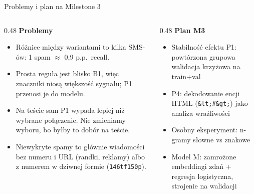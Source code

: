 \documentclass[aspectratio=169,10pt]{beamer}
\begin{document}
\begin{frame}{Problemy i plan na Milestone 3}
  \begin{columns}[T]
    \begin{column}{0.48\textwidth}
      \textbf{Problemy}
      \begin{itemize}
        \item Różnice między wariantami to kilka SMS-ów: 1 spam $\approx$ 0,9 p.p.\ recall.
        \item Prosta reguła jest blisko B1, więc znaczniki niosą większość sygnału; P1 przenosi je do modelu.
        \item Na teście sam P1 wypada lepiej niż wybrane połączenie. Nie zmieniamy wyboru, bo byłby to dobór na teście.
        \item Niewykryte spamy to głównie wiadomości bez numeru i URL (randki, reklamy) albo z numerem w dziwnej formie (\texttt{146tf150p}).
      \end{itemize}
    \end{column}
    \begin{column}{0.48\textwidth}
      \textbf{Plan M3}
      \begin{itemize}
        \item Stabilność efektu P1: powtórzona grupowa walidacja krzyżowa na train+val
        \item P4: dekodowanie encji HTML (\texttt{\&lt;\#\&gt;}) jako analiza wrażliwości
        \item Osobny eksperyment: n-gramy słowne vs znakowe
        \item Model M: zamrożone embeddingi zdań + regresja logistyczna, strojenie na walidacji
      \end{itemize}
    \end{column}
  \end{columns}
\end{frame}
\end{document}
